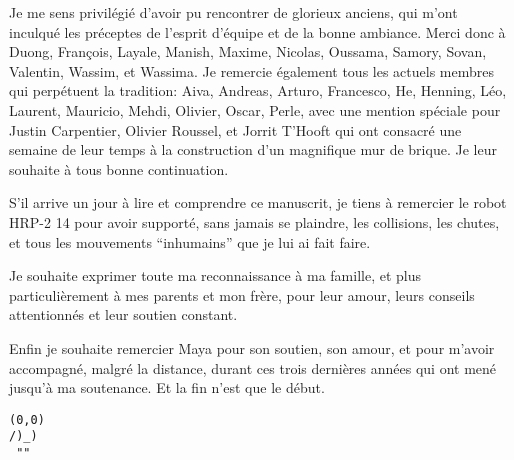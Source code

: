 Je me sens privil\'egi\'e d'avoir pu rencontrer de glorieux anciens,
qui m'ont inculqu\'e les pr\'eceptes de l'esprit d'\'equipe et de la
bonne ambiance. Merci donc \`a Duong, Fran\c{c}ois, Layale, Manish,
Maxime, Nicolas, Oussama, Samory, Sovan, Valentin, Wassim, et
Wassima. Je remercie \'egalement tous les actuels membres qui
perp\'etuent la tradition: Aiva, Andreas, Arturo, Francesco, He,
Henning, L\'eo, Laurent, Mauricio, Mehdi, Olivier, Oscar, Perle, avec
une mention sp\'eciale pour Justin Carpentier, Olivier Roussel, et
Jorrit T'Hooft qui ont consacr\'e une semaine de leur temps \`a la
construction d'un magnifique mur de brique. Je leur souhaite \`a tous
bonne continuation.

S'il arrive un jour \`a lire et comprendre ce manuscrit, je tiens \`a
remercier le robot HRP-2 14 pour avoir support\'e, sans jamais se
plaindre, les collisions, les chutes, et tous les mouvements
``inhumains'' que je lui ai fait faire.

Je souhaite exprimer toute ma reconnaissance \`a ma famille, et plus
particuli\`erement \`a mes parents et mon fr\`ere, pour leur amour,
leurs conseils attentionn\'es et leur soutien constant.

Enfin je souhaite remercier Maya pour son soutien, son amour, et pour
m'avoir accompagn\'e, malgr\'e la distance, durant ces trois
derni\`eres ann\'ees qui ont men\'e jusqu'\`a ma soutenance. Et la fin
n'est que le d\'ebut.

\begin{verbatim}
(0,0)
/)_)
 ""
\end{verbatim}
